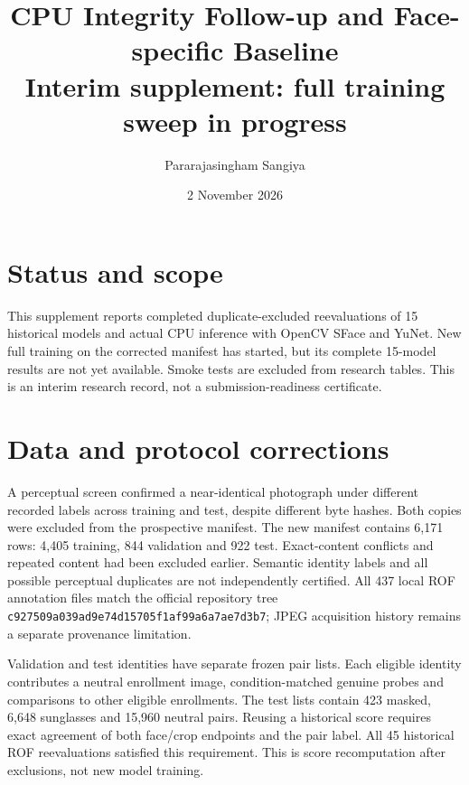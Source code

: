 \documentclass[10pt,journal,onecolumn,compsoc]{IEEEtran}
\title{CPU Integrity Follow-up and Face-specific Baseline\\\large Interim supplement: full training sweep in progress}
\author{Pararajasingham Sangiya}
\date{2 November 2026}
\begin{document}
\maketitle
\section{Status and scope}
This supplement reports completed duplicate-excluded reevaluations of 15 historical models and actual CPU inference with OpenCV SFace and YuNet. New full training on the corrected manifest has started, but its complete 15-model results are not yet available. Smoke tests are excluded from research tables. This is an interim research record, not a submission-readiness certificate.
\section{Data and protocol corrections}
A perceptual screen confirmed a near-identical photograph under different recorded labels across training and test, despite different byte hashes. Both copies were excluded from the prospective manifest. The new manifest contains 6,171 rows: 4,405 training, 844 validation and 922 test. Exact-content conflicts and repeated content had been excluded earlier. Semantic identity labels and all possible perceptual duplicates are not independently certified. All 437 local ROF annotation files match the official repository tree \texttt{c927509a039ad9e74d15705f1af99a6a7ae7d3b7}; JPEG acquisition history remains a separate provenance limitation.

Validation and test identities have separate frozen pair lists. Each eligible identity contributes a neutral enrollment image, condition-matched genuine probes and comparisons to other eligible enrollments. The test lists contain 423 masked, 6,648 sunglasses and 15,960 neutral pairs. Reusing a historical score requires exact agreement of both face/crop endpoints and the pair label. All 45 historical ROF reevaluations satisfied this requirement. This is score recomputation after exclusions, not new model training.
\end{document}
